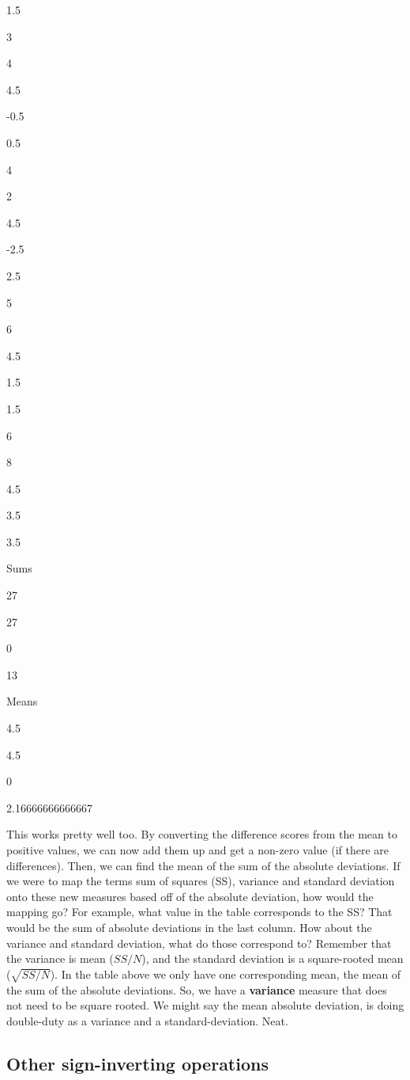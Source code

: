 \documentclass[]{book}
\begin{document}
1.5

3

4

4.5

-0.5

0.5

4

2

4.5

-2.5

2.5

5

6

4.5

1.5

1.5

6

8

4.5

3.5

3.5

Sums

27

27

0

13

Means

4.5

4.5

0

2.16666666666667

This works pretty well too. By converting the difference scores from the mean to positive values, we can now add them up and get a non-zero value (if there are differences). Then, we can find the mean of the sum of the absolute deviations. If we were to map the terms sum of squares (SS), variance and standard deviation onto these new measures based off of the absolute deviation, how would the mapping go? For example, what value in the table corresponds to the SS? That would be the sum of absolute deviations in the last column. How about the variance and standard deviation, what do those correspond to? Remember that the variance is mean (\(SS/N\)), and the standard deviation is a square-rooted mean (\(\sqrt{SS/N}\)). In the table above we only have one corresponding mean, the mean of the sum of the absolute deviations. So, we have a \textbf{variance} measure that does not need to be square rooted. We might say the mean absolute deviation, is doing double-duty as a variance and a standard-deviation. Neat.

\hypertarget{other-sign-inverting-operations}{%
\subsection{Other sign-inverting operations}\label{other-sign-inverting-operations}}
\end{document}

